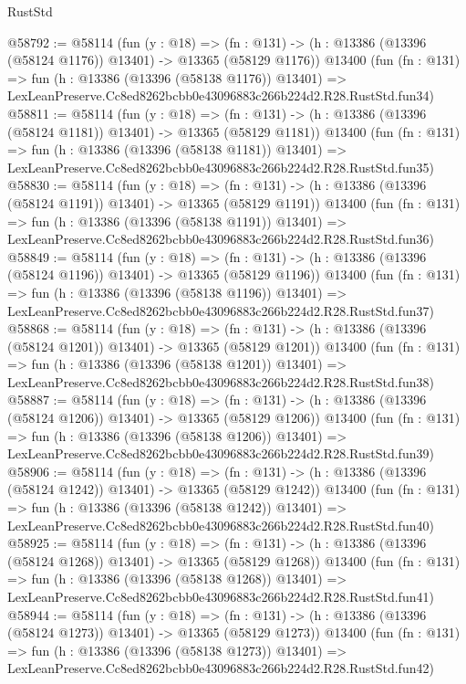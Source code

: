 \begin{lexlean}{RustStd}
\begin{coremodule}
@58792 := @58114
    (fun (y : @18) =>
    (fn : @131) -> (h : @13386 (@13396 (@58124 @1176)) @13401) -> @13365 (@58129 @1176))
    @13400
    (fun (fn : @131) =>
    fun (h : @13386 (@13396 (@58138 @1176)) @13401) =>
    LexLeanPreserve.Cc8ed8262bcbb0e43096883c266b224d2.R28.RustStd.fun34)
@58811 := @58114
    (fun (y : @18) =>
    (fn : @131) -> (h : @13386 (@13396 (@58124 @1181)) @13401) -> @13365 (@58129 @1181))
    @13400
    (fun (fn : @131) =>
    fun (h : @13386 (@13396 (@58138 @1181)) @13401) =>
    LexLeanPreserve.Cc8ed8262bcbb0e43096883c266b224d2.R28.RustStd.fun35)
@58830 := @58114
    (fun (y : @18) =>
    (fn : @131) -> (h : @13386 (@13396 (@58124 @1191)) @13401) -> @13365 (@58129 @1191))
    @13400
    (fun (fn : @131) =>
    fun (h : @13386 (@13396 (@58138 @1191)) @13401) =>
    LexLeanPreserve.Cc8ed8262bcbb0e43096883c266b224d2.R28.RustStd.fun36)
@58849 := @58114
    (fun (y : @18) =>
    (fn : @131) -> (h : @13386 (@13396 (@58124 @1196)) @13401) -> @13365 (@58129 @1196))
    @13400
    (fun (fn : @131) =>
    fun (h : @13386 (@13396 (@58138 @1196)) @13401) =>
    LexLeanPreserve.Cc8ed8262bcbb0e43096883c266b224d2.R28.RustStd.fun37)
@58868 := @58114
    (fun (y : @18) =>
    (fn : @131) -> (h : @13386 (@13396 (@58124 @1201)) @13401) -> @13365 (@58129 @1201))
    @13400
    (fun (fn : @131) =>
    fun (h : @13386 (@13396 (@58138 @1201)) @13401) =>
    LexLeanPreserve.Cc8ed8262bcbb0e43096883c266b224d2.R28.RustStd.fun38)
@58887 := @58114
    (fun (y : @18) =>
    (fn : @131) -> (h : @13386 (@13396 (@58124 @1206)) @13401) -> @13365 (@58129 @1206))
    @13400
    (fun (fn : @131) =>
    fun (h : @13386 (@13396 (@58138 @1206)) @13401) =>
    LexLeanPreserve.Cc8ed8262bcbb0e43096883c266b224d2.R28.RustStd.fun39)
@58906 := @58114
    (fun (y : @18) =>
    (fn : @131) -> (h : @13386 (@13396 (@58124 @1242)) @13401) -> @13365 (@58129 @1242))
    @13400
    (fun (fn : @131) =>
    fun (h : @13386 (@13396 (@58138 @1242)) @13401) =>
    LexLeanPreserve.Cc8ed8262bcbb0e43096883c266b224d2.R28.RustStd.fun40)
@58925 := @58114
    (fun (y : @18) =>
    (fn : @131) -> (h : @13386 (@13396 (@58124 @1268)) @13401) -> @13365 (@58129 @1268))
    @13400
    (fun (fn : @131) =>
    fun (h : @13386 (@13396 (@58138 @1268)) @13401) =>
    LexLeanPreserve.Cc8ed8262bcbb0e43096883c266b224d2.R28.RustStd.fun41)
@58944 := @58114
    (fun (y : @18) =>
    (fn : @131) -> (h : @13386 (@13396 (@58124 @1273)) @13401) -> @13365 (@58129 @1273))
    @13400
    (fun (fn : @131) =>
    fun (h : @13386 (@13396 (@58138 @1273)) @13401) =>
    LexLeanPreserve.Cc8ed8262bcbb0e43096883c266b224d2.R28.RustStd.fun42)

\end{coremodule}
\end{lexlean}
